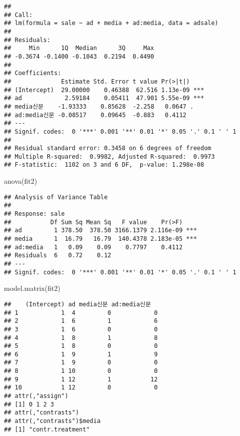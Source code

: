 \documentclass[
]{book}
\newenvironment{Shaded}{\begin{snugshade}}{\end{snugshade}}
\newcommand{\FunctionTok}[1]{\textcolor[rgb]{0.00,0.00,0.00}{#1}}
\newcommand{\NormalTok}[1]{#1}
\begin{document}
\begin{verbatim}
## 
## Call:
## lm(formula = sale ~ ad + media + ad:media, data = adsale)
## 
## Residuals:
##     Min      1Q  Median      3Q     Max 
## -0.3674 -0.1400 -0.1043  0.2194  0.4490 
## 
## Coefficients:
##              Estimate Std. Error t value Pr(>|t|)    
## (Intercept)  29.00000    0.46388  62.516 1.13e-09 ***
## ad            2.59184    0.05411  47.901 5.55e-09 ***
## media신문    -1.93333    0.85628  -2.258   0.0647 .  
## ad:media신문 -0.08517    0.09645  -0.883   0.4112    
## ---
## Signif. codes:  0 '***' 0.001 '**' 0.01 '*' 0.05 '.' 0.1 ' ' 1
## 
## Residual standard error: 0.3458 on 6 degrees of freedom
## Multiple R-squared:  0.9982, Adjusted R-squared:  0.9973 
## F-statistic:  1102 on 3 and 6 DF,  p-value: 1.298e-08
\end{verbatim}

\begin{Shaded}
\begin{Highlighting}[]
\FunctionTok{anova}\NormalTok{(fit2)}
\end{Highlighting}
\end{Shaded}

\begin{verbatim}
## Analysis of Variance Table
## 
## Response: sale
##           Df Sum Sq Mean Sq   F value    Pr(>F)    
## ad         1 378.50  378.50 3166.1379 2.116e-09 ***
## media      1  16.79   16.79  140.4378 2.183e-05 ***
## ad:media   1   0.09    0.09    0.7797    0.4112    
## Residuals  6   0.72    0.12                        
## ---
## Signif. codes:  0 '***' 0.001 '**' 0.01 '*' 0.05 '.' 0.1 ' ' 1
\end{verbatim}

\begin{Shaded}
\begin{Highlighting}[]
\FunctionTok{model.matrix}\NormalTok{(fit2)}
\end{Highlighting}
\end{Shaded}

\begin{verbatim}
##    (Intercept) ad media신문 ad:media신문
## 1            1  4         0            0
## 2            1  6         1            6
## 3            1  6         0            0
## 4            1  8         1            8
## 5            1  8         0            0
## 6            1  9         1            9
## 7            1  9         0            0
## 8            1 10         0            0
## 9            1 12         1           12
## 10           1 12         0            0
## attr(,"assign")
## [1] 0 1 2 3
## attr(,"contrasts")
## attr(,"contrasts")$media
## [1] "contr.treatment"
\end{verbatim}
\end{document}
